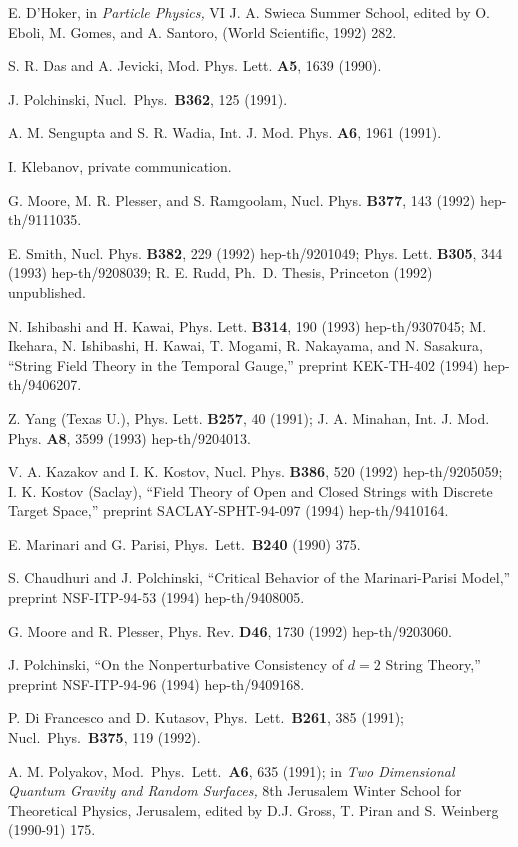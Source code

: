 \begin{thebibliography}{99}
 E. D'Hoker, in {\it Particle Physics,} VI J. A.
Swieca Summer School, edited by O. Eboli, M. Gomes, and A. Santoro,
(World Scientific, 1992) 282.

 S. R. Das and A. Jevicki, Mod. Phys. Lett. {\bf
A5}, 1639 (1990).

 J. Polchinski, Nucl.~Phys.~{\bf B362}, 125 (1991).

 A. M. Sengupta and S. R. Wadia, Int. J. Mod. Phys.
{\bf A6}, 1961 (1991).

 I. Klebanov, private communication.

 G. Moore, M. R. Plesser, and S. Ramgoolam,
Nucl. Phys. {\bf B377}, 143 (1992) hep-th/9111035.

 E. Smith, Nucl. Phys. {\bf B382}, 229 (1992)  
hep-th/9201049; Phys. Lett. {\bf B305}, 344 (1993) hep-th/9208039;
R. E. Rudd, Ph.~D. Thesis, Princeton (1992)
unpublished.
 
 N. Ishibashi and H. Kawai,
Phys. Lett. {\bf B314}, 190 (1993) hep-th/9307045;
 M. Ikehara, N. Ishibashi, H. Kawai, T. Mogami,
R. Nakayama, and N. Sasakura, ``String Field Theory in the Temporal 
Gauge,'' preprint KEK-TH-402 (1994)
hep-th/9406207.

 Z. Yang (Texas U.), 
Phys. Lett. {\bf B257}, 40 (1991); 
J. A. Minahan, Int. J.
Mod. Phys. {\bf A8}, 3599 (1993) hep-th/9204013.

 V. A. Kazakov and I. K. Kostov,
Nucl. Phys. {\bf B386}, 520 (1992) hep-th/9205059;
I. K. Kostov (Saclay), ``Field Theory of Open and Closed Strings with
Discrete Target Space,''
preprint SACLAY-SPHT-94-097 (1994)
hep-th/9410164.

 E. Marinari and G. Parisi, Phys.~Lett.~{\bf B240}
(1990) 375.

 S. Chaudhuri and J. Polchinski, ``Critical Behavior
of the Marinari-Parisi Model,'' preprint NSF-ITP-94-53 
(1994) hep-th/9408005.

 G. Moore and R. Plesser, Phys. Rev. {\bf D46},
1730 (1992) hep-th/9203060. 

 J. Polchinski, ``On the Nonperturbative
Consistency of $d=2$ String Theory,'' preprint NSF-ITP-94-96
(1994) hep-th/9409168.

 P. Di Francesco and D. Kutasov, Phys.~Lett.~{\bf B261},
385 (1991); Nucl.~Phys.~{\bf B375}, 119 (1992).

 A. M. Polyakov, Mod.~Phys.~Lett.~{\bf A6}, 635
(1991); in {\it Two Dimensional Quantum Gravity and Random
Surfaces,} 8th Jerusalem Winter School for Theoretical Physics,
Jerusalem, edited by D.J. Gross, T. Piran and S. Weinberg
(1990-91) 175.


\end{thebibliography}
